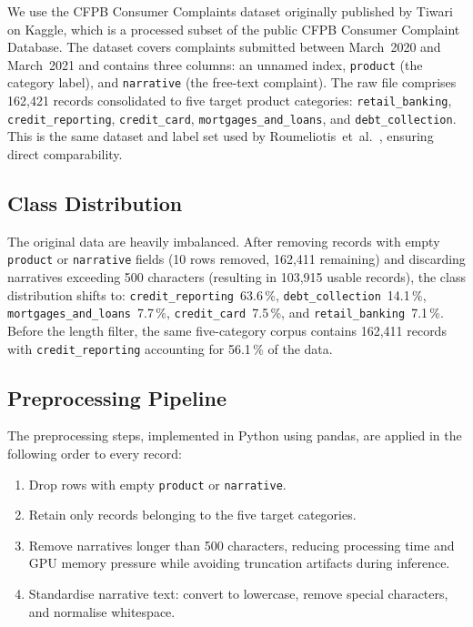 \documentclass[journal]{IEEEtran}
\begin{document}
We use the CFPB Consumer Complaints dataset originally published by
Tiwari \cite{tiwari2021cfpb} on Kaggle, which is a processed subset
of the public CFPB Consumer Complaint Database. The dataset covers
complaints submitted between March~2020 and March~2021 and contains
three columns: an unnamed index, \texttt{product} (the category label),
and \texttt{narrative} (the free-text complaint). The raw file
comprises 162,421 records consolidated to five target product categories:
\texttt{retail\_banking}, \texttt{credit\_reporting},
\texttt{credit\_card}, \texttt{mortgages\_and\_loans}, and
\texttt{debt\_collection}. This is the same dataset and label set used
by Roumeliotis~et~al.\ \cite{roumeliotis2025think}, ensuring
direct comparability.

\subsection{Class Distribution}

The original data are heavily imbalanced. After removing records with
empty \texttt{product} or \texttt{narrative} fields (10 rows removed,
162,411 remaining) and discarding narratives exceeding 500 characters
(resulting in 103,915 usable records), the class distribution shifts
to: \texttt{credit\_reporting}~63.6\,\%,
\texttt{debt\_collection}~14.1\,\%,
\texttt{mortgages\_and\_loans}~7.7\,\%,
\texttt{credit\_card}~7.5\,\%, and
\texttt{retail\_banking}~7.1\,\%. Before the length filter, the same
five-category corpus contains 162,411 records with
\texttt{credit\_reporting} accounting for 56.1\,\% of the data.

\subsection{Preprocessing Pipeline}

The preprocessing steps, implemented in Python using pandas, are applied
in the following order to every record:

\begin{enumerate}
  \item Drop rows with empty \texttt{product} or \texttt{narrative}.
  \item Retain only records belonging to the five target categories.
  \item Remove narratives longer than 500 characters, reducing processing
        time and GPU memory pressure while avoiding truncation artifacts
        during inference.
  \item Standardise narrative text: convert to lowercase, remove special
        characters, and normalise whitespace.
\end{enumerate}
\end{document}

